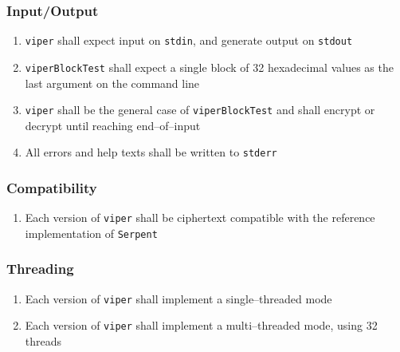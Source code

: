 \subsubsection{Input/Output}
\begin{enumerate}
\item \texttt{viper} shall expect input on \texttt{stdin}, and generate output on \texttt{stdout}
\item \texttt{viperBlockTest} shall expect a single block of 32 hexadecimal values as the last argument on the command line
\item \texttt{viper} shall be the general case of \texttt{viperBlockTest} and shall encrypt or decrypt until reaching end--of--input
\item All errors and help texts shall be written to \texttt{stderr}
\end{enumerate}

\subsubsection{Compatibility}
\begin{enumerate}
\item Each version of \texttt{viper} shall be ciphertext compatible with the reference implementation of \texttt{Serpent} \cite{submission-files, referenceImplementation}
\end{enumerate}

\subsubsection{Threading}
\label{threading}
\begin{enumerate}
\item Each version of \texttt{viper} shall implement a single--threaded mode
\item Each version of \texttt{viper} shall implement a multi--threaded mode, using 32 threads
\end{enumerate}
